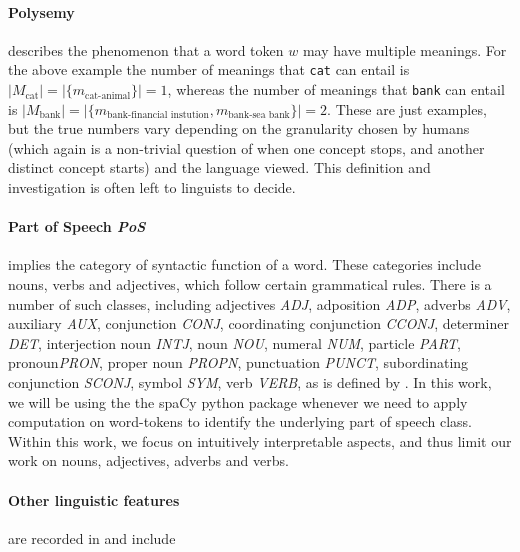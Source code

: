 \documentclass[a4paper,12pt,twoside,openright]{report}
\begin{document}

\paragraph{Polysemy} describes the phenomenon that a word token $w$ may have multiple meanings.
For the above example the number of meanings that \Verb#cat# can entail is $ | M_\text{cat} | = | \{ m_\text{cat-animal} \} |  = 1$, whereas the number of meanings that \Verb#bank# can entail is $ | M_\text{bank} | = | \{ m_\text{bank-financial instution},  m_\text{bank-sea bank}\} |  = 2$.
These are just examples, but the true numbers vary depending on the granularity chosen by humans (which again is a non-trivial question of when one concept stops, and another distinct concept starts) and the language viewed.
This definition and investigation is often left to linguists to decide. \\

\paragraph{Part of Speech \textit{PoS}} implies the category of syntactic function of a word.
These categories include nouns, verbs and adjectives, which follow certain grammatical rules.
There is a number of such classes, including adjectives \textit{ADJ}, adposition \textit{ADP}, adverbs \textit{ADV}, auxiliary \textit{AUX}, conjunction \textit{CONJ}, coordinating conjunction \textit{CCONJ}, determiner \textit{DET}, interjection noun \textit{INTJ}, noun \textit{NOU}, numeral \textit{NUM}, particle \textit{PART}, pronoun\textit{PRON}, proper noun \textit{PROPN}, punctuation \textit{PUNCT}, subordinating conjunction \textit{SCONJ}, symbol \textit{SYM}, verb \textit{VERB}, as is defined by \cite{spacyb}.
In this work, we will be using the the spaCy python package  \cite{spacy} whenever we need to apply computation on word-tokens to identify the underlying part of speech class.
Within this work, we focus on intuitively interpretable aspects, and thus limit our work on nouns, adjectives, adverbs and verbs.

\paragraph{Other linguistic features} are recorded in \cite{wang19} and include
\end{document}
